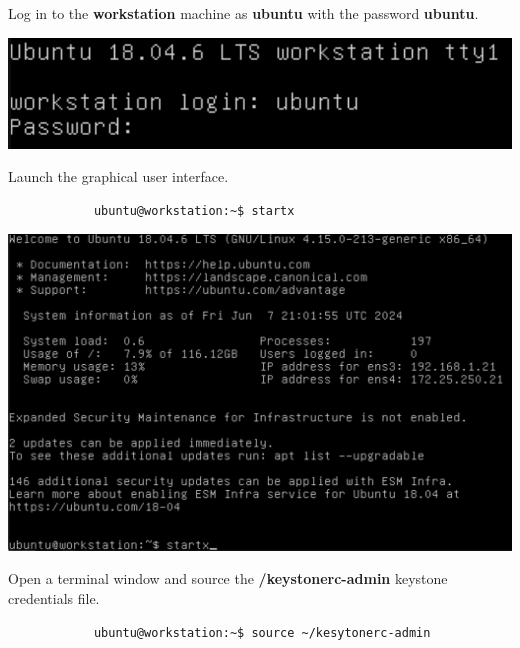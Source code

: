 \documentclass[letterpaper, 12pt]{article}
\begin{document}
\begin{enumerate}
    \begin{labstep}
        Log in to the \textbf{workstation} machine as \textbf{ubuntu} with the password \textbf{ubuntu}.

        \begin{center}
            \includegraphics[width=\linewidth]{images/part1/step1.png}
        \end{center}
    \end{labstep}

    \begin{labstep}
        Launch the graphical user interface.
        \begin{lstlisting}
            ubuntu@workstation:~$ startx
        \end{lstlisting}

        \begin{center}
            \includegraphics[width=\linewidth]{images/part1/step2.png}
        \end{center}
    \end{labstep}

    \begin{labstep}
        Open a terminal window and source the \textbf{\texttildemid/keystonerc-admin} keystone credentials file.
        \begin{lstlisting}
            ubuntu@workstation:~$ source ~/kesytonerc-admin
        \end{lstlisting}


\end{labstep}
\end{enumerate}
\end{document}
